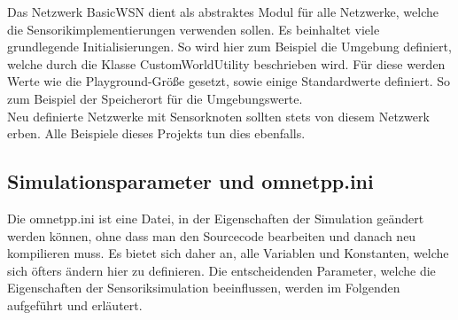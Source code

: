 Das Netzwerk BasicWSN dient als abstraktes Modul für alle Netzwerke, welche die Sensorikimplementierungen verwenden sollen. Es beinhaltet viele grundlegende Initialisierungen. So wird hier zum Beispiel die Umgebung definiert, welche durch die Klasse CustomWorldUtility beschrieben wird. Für diese werden Werte wie die Playground-Größe gesetzt, sowie einige Standardwerte definiert. So zum Beispiel der Speicherort für die Umgebungswerte.\\
Neu definierte Netzwerke mit Sensorknoten sollten stets von diesem Netzwerk erben. Alle Beispiele dieses Projekts tun dies ebenfalls. 

\subsection{Simulationsparameter und omnetpp.ini}

Die omnetpp.ini ist eine Datei, in der Eigenschaften der Simulation geändert werden können, ohne dass man den Sourcecode bearbeiten und danach neu kompilieren muss. Es bietet sich daher an, alle Variablen und Konstanten, welche sich öfters ändern hier zu definieren. Die entscheidenden Parameter, welche die Eigenschaften der Sensoriksimulation beeinflussen, werden im Folgenden aufgeführt und erläutert.

